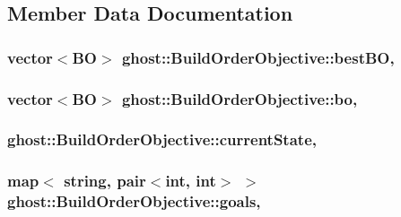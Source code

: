 \subsection{Member Data Documentation}
\hypertarget{classghost_1_1BuildOrderObjective_a71ec5c0a8425d3e5facebb76190adfb7}{
\subsubsection[{best\-B\-O}]{\setlength{\rightskip}{0pt plus 5cm}vector$<${\bf B\-O}$>$ ghost\-::\-Build\-Order\-Objective\-::best\-B\-O\hspace{0.3cm}{\ttfamily [mutable]}, {\ttfamily [protected]}}}\label{classghost_1_1BuildOrderObjective_a71ec5c0a8425d3e5facebb76190adfb7}
\hypertarget{classghost_1_1BuildOrderObjective_aa55dce8a8fbdc5fe64ddadfa715e968e}{
\subsubsection[{bo}]{\setlength{\rightskip}{0pt plus 5cm}vector$<${\bf B\-O}$>$ ghost\-::\-Build\-Order\-Objective\-::bo\hspace{0.3cm}{\ttfamily [mutable]}, {\ttfamily [protected]}}}\label{classghost_1_1BuildOrderObjective_aa55dce8a8fbdc5fe64ddadfa715e968e}
\hypertarget{classghost_1_1BuildOrderObjective_acb4b4b2c9dc0e99ab98e61289c62aff8}{
\subsubsection[{current\-State}]{ ghost\-::\-Build\-Order\-Objective\-::current\-State\hspace{0.3cm}{\ttfamily [mutable]}, {\ttfamily [protected]}}}\label{classghost_1_1BuildOrderObjective_acb4b4b2c9dc0e99ab98e61289c62aff8}
\hypertarget{classghost_1_1BuildOrderObjective_a714a7fc416d8925bc7d2b9026e9a212c}{
\subsubsection[{goals}]{\setlength{\rightskip}{0pt plus 5cm}map$<$ string, pair$<$int, int$>$ $>$ ghost\-::\-Build\-Order\-Objective\-::goals\hspace{0.3cm}{\ttfamily [mutable]}, {\ttfamily [protected]}}}\label{classghost_1_1BuildOrderObjective_a714a7fc416d8925bc7d2b9026e9a212c}


